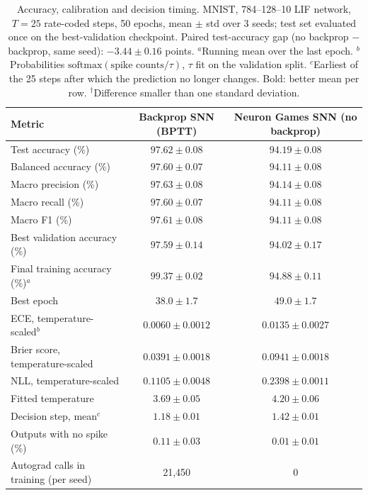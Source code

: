 
\begin{table}[t]
\centering
\small
\caption{Accuracy, calibration and decision timing. MNIST, 784--128--10 LIF network, $T=25$ rate-coded steps, 50 epochs, mean $\pm$ std over 3 seeds; test set evaluated once on the best-validation checkpoint. Paired test-accuracy gap (no backprop $-$ backprop, same seed): $-3.44 \pm 0.16$ points. $^a$Running mean over the last epoch. $^b$Probabilities $\mathrm{softmax}(\text{spike counts}/\tau)$, $\tau$ fit on the validation split. $^c$Earliest of the 25 steps after which the prediction no longer changes. Bold: better mean per row. $^\dagger$Difference smaller than one standard deviation.}
\label{tab:ng-accuracy}
\begin{tabular}{lcc}
\toprule
Metric & Backprop SNN (BPTT) & Neuron Games SNN (no backprop) \\
\midrule
Test accuracy (\%) & $\boldsymbol{97.62 \pm 0.08}$ & $94.19 \pm 0.08$ \\
Balanced accuracy (\%) & $\boldsymbol{97.60 \pm 0.07}$ & $94.11 \pm 0.08$ \\
Macro precision (\%) & $\boldsymbol{97.63 \pm 0.08}$ & $94.14 \pm 0.08$ \\
Macro recall (\%) & $\boldsymbol{97.60 \pm 0.07}$ & $94.11 \pm 0.08$ \\
Macro F1 (\%) & $\boldsymbol{97.61 \pm 0.08}$ & $94.11 \pm 0.08$ \\
Best validation accuracy (\%) & $\boldsymbol{97.59 \pm 0.14}$ & $94.02 \pm 0.17$ \\
Final training accuracy (\%)$^a$ & $99.37 \pm 0.02$ & $94.88 \pm 0.11$ \\
Best epoch & $38.0 \pm 1.7$ & $49.0 \pm 1.7$ \\
\midrule
ECE, temperature-scaled$^b$ & $\boldsymbol{0.0060 \pm 0.0012}$ & $0.0135 \pm 0.0027$ \\
Brier score, temperature-scaled & $\boldsymbol{0.0391 \pm 0.0018}$ & $0.0941 \pm 0.0018$ \\
NLL, temperature-scaled & $\boldsymbol{0.1105 \pm 0.0048}$ & $0.2398 \pm 0.0011$ \\
Fitted temperature & $3.69 \pm 0.05$ & $4.20 \pm 0.06$ \\
\midrule
Decision step, mean$^c$ & $\boldsymbol{1.18 \pm 0.01}$ & $1.42 \pm 0.01$ \\
Outputs with no spike (\%) & $0.11 \pm 0.03$ & $\boldsymbol{0.01 \pm 0.01}$ \\
Autograd calls in training (per seed) & 21{,}450 & 0 \\
\bottomrule
\end{tabular}
\end{table}

